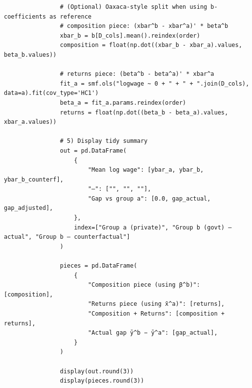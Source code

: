 \documentclass[12pt]{article}
\numberwithin{equation}{section}
\begin{document}
\begin{enumerate}[leftmargin=2em]
\begin{enumerate}[label=(\alph*),leftmargin=1.6em]
                \begin{listing}[H]
                \begin{verbatim}
                # (Optional) Oaxaca-style split when using b-coefficients as reference
                # composition piece: (xbar^b - xbar^a)' * beta^b
                xbar_b = b[D_cols].mean().reindex(order)
                composition = float(np.dot((xbar_b - xbar_a).values, beta_b.values))
                
                # returns piece: (beta^b - beta^a)' * xbar^a
                fit_a = smf.ols("logwage ~ 0 + " + " + ".join(D_cols), data=a).fit(cov_type='HC1')
                beta_a = fit_a.params.reindex(order)
                returns = float(np.dot((beta_b - beta_a).values, xbar_a.values))
                
                # 5) Display tidy summary
                out = pd.DataFrame(
                    {
                        "Mean log wage": [ybar_a, ybar_b, ybar_b_counterf],
                        "—": ["", "", ""],
                        "Gap vs group a": [0.0, gap_actual, gap_adjusted],
                    },
                    index=["Group a (private)", "Group b (govt) – actual", "Group b – counterfactual"]
                )
                
                pieces = pd.DataFrame(
                    {
                        "Composition piece (using β^b)": [composition],
                        "Returns piece (using x̄^a)": [returns],
                        "Composition + Returns": [composition + returns],
                        "Actual gap ȳ^b − ȳ^a": [gap_actual],
                    }
                )
                
                display(out.round(3))
                display(pieces.round(3))
            \end{verbatim}
            \caption{Code (Part 2): Oaxaca-style decomposition and summary output.}
        \end{listing}
    

\end{enumerate}
\end{enumerate}
\end{document}

